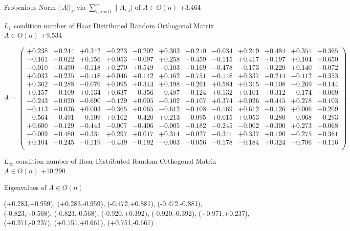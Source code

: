 \documentclass[9pt]{article}
\theoremstyle{plain}
\theoremstyle{definition}
\theoremstyle{remark}
\numberwithin{equation}{section}
\begin{document}
Frobenious Norm  $||A||_{\textit{F}}$ via $\sum\limits_{i,j =0}^{n} \|A_{i,j}|$   of  $A \in O(n)$  +3.464

$L_1$ condition number of Haar Distributed Random Orthogonal Matrix $A \in O(n)$ +9.534

$A = \left(
\begin{array}{
cccccccccccc}
+0.238 & +0.244 & +0.342 & -0.223 & -0.202 & +0.303 & +0.210 & -0.034 & +0.219 & +0.484 & +0.351 & -0.365 \\
-0.161 & +0.022 & +0.156 & +0.053 & -0.097 & +0.258 & -0.459 & -0.115 & +0.417 & +0.197 & +0.104 & +0.650 \\
-0.010 & +0.490 & -0.118 & +0.270 & +0.549 & -0.103 & -0.169 & -0.478 & -0.173 & +0.220 & +0.140 & -0.072 \\
+0.033 & +0.235 & -0.118 & +0.046 & +0.142 & +0.162 & +0.751 & -0.148 & +0.337 & -0.214 & -0.112 & +0.353 \\
+0.362 & +0.288 & -0.076 & +0.095 & +0.344 & +0.198 & -0.261 & +0.584 & +0.315 & -0.108 & -0.269 & -0.144 \\
+0.157 & +0.109 & +0.134 & +0.637 & -0.356 & -0.487 & +0.124 & +0.132 & +0.101 & +0.312 & -0.174 & +0.069 \\
-0.243 & +0.020 & -0.690 & -0.129 & +0.005 & -0.102 & +0.107 & +0.374 & +0.026 & +0.445 & +0.278 & +0.103 \\
-0.113 & +0.036 & +0.003 & -0.365 & +0.065 & -0.612 & -0.108 & -0.169 & +0.612 & -0.126 & +0.006 & -0.209 \\
-0.564 & +0.491 & -0.109 & +0.162 & -0.420 & +0.213 & -0.095 & +0.015 & +0.053 & -0.280 & -0.068 & -0.293 \\
+0.600 & +0.129 & -0.443 & -0.007 & -0.406 & -0.005 & -0.182 & -0.245 & -0.002 & -0.300 & +0.273 & +0.068 \\
-0.009 & -0.480 & -0.331 & +0.297 & +0.017 & +0.314 & -0.027 & -0.341 & +0.337 & +0.190 & -0.275 & -0.361 \\
+0.104 & +0.245 & -0.119 & -0.439 & -0.192 & -0.003 & -0.056 & -0.178 & -0.184 & +0.324 & -0.706 & +0.116 \\
\end{array}
\right)$ \newline 

$L_{\infty}$ condition number of Haar Distributed Random Orthogonal Matrix $A \in O(n)$ +10.290

Eigenvalues of $A \in O(n)$

(+0.283,+0.959), (+0.283,-0.959), (-0.472,+0.881), (-0.472,-0.881), (-0.823,+0.568), (-0.823,-0.568), (-0.920,+0.392), (-0.920,-0.392), (+0.971,+0.237), (+0.971,-0.237), (+0.751,+0.661), (+0.751,-0.661)
\end{document}
